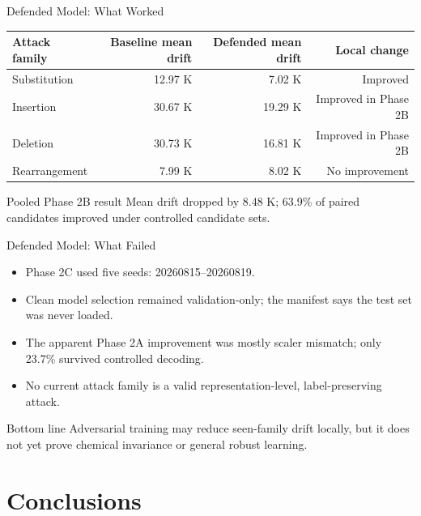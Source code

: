\documentclass[aspectratio=169,10pt]{beamer}
\begin{document}
\begin{frame}{Defended Model: What Worked}
\scriptsize
\begin{tabular}{@{}lrrr@{}}
\toprule
Attack family & Baseline mean drift & Defended mean drift & Local change\\
\midrule
Substitution & 12.97 K & 7.02 K & Improved\\
Insertion & 30.67 K & 19.29 K & Improved in Phase 2B\\
Deletion & 30.73 K & 16.81 K & Improved in Phase 2B\\
Rearrangement & 7.99 K & 8.02 K & No improvement\\
\bottomrule
\end{tabular}

\vspace{1em}
\begin{block}{Pooled Phase 2B result}
Mean drift dropped by 8.48 K; 63.9\% of paired candidates improved under controlled candidate sets.
\end{block}
\end{frame}

\begin{frame}{Defended Model: What Failed}
\begin{itemize}
  \item Phase 2C used five seeds: 20260815--20260819.
  \item Clean model selection remained validation-only; the manifest says the test set was never loaded.
  \item The apparent Phase 2A improvement was mostly scaler mismatch; only 23.7\% survived controlled decoding.
  \item No current attack family is a valid representation-level, label-preserving attack.
\end{itemize}

\begin{alertblock}{Bottom line}
Adversarial training may reduce seen-family drift locally, but it does not yet prove chemical invariance or general robust learning.
\end{alertblock}
\end{frame}

\section{Conclusions}
\end{document}
